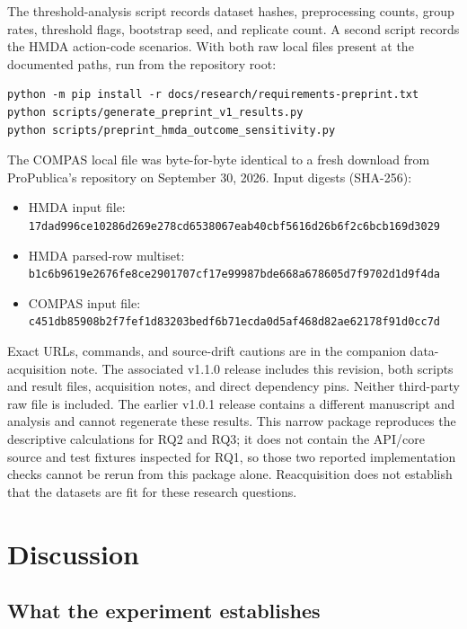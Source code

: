 \documentclass[10pt]{article}
\newcommand{\code}[1]{\texttt{#1}}
\begin{document}
The threshold-analysis script records dataset hashes, preprocessing counts,
group rates, threshold flags, bootstrap seed, and replicate count. A second
script records the HMDA action-code scenarios. With both raw local files
present at the documented paths, run from the repository root:

\begin{verbatim}
python -m pip install -r docs/research/requirements-preprint.txt
python scripts/generate_preprint_v1_results.py
python scripts/preprint_hmda_outcome_sensitivity.py
\end{verbatim}

The COMPAS local file was byte-for-byte identical to a fresh download from
ProPublica's repository on September 30, 2026. Input digests (SHA-256):

\begin{itemize}
\item HMDA input file: {\footnotesize\code{17dad996ce10286d269e278cd6538067eab40cbf5616d26b6f2c6bcb169d3029}}
\item HMDA parsed-row multiset: {\footnotesize\code{b1c6b9619e2676fe8ce2901707cf17e99987bde668a678605d7f9702d1d9f4da}}
\item COMPAS input file: {\footnotesize\code{c451db85908b2f7fef1d83203bedf6b71ecda0d5af468d82ae62178f91d0cc7d}}
\end{itemize}

\noindent Exact URLs, commands, and source-drift cautions are in the companion
data-acquisition note. The associated v1.1.0 release includes this revision,
both scripts and result files, acquisition notes, and direct dependency pins.
Neither third-party raw file is included. The earlier v1.0.1 release contains a
different manuscript and analysis and cannot regenerate these results.
This narrow package reproduces the descriptive calculations for RQ2 and RQ3;
it does not contain the API/core source and test fixtures inspected for RQ1,
so those two reported implementation checks cannot be rerun from this package
alone.
Reacquisition does not establish that the datasets are fit for these research
questions.

\section{Discussion}

\subsection{What the experiment establishes}
\end{document}
